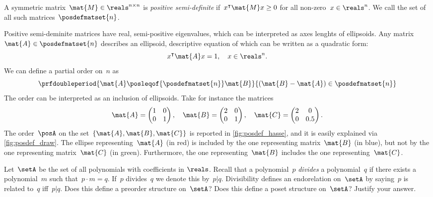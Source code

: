 \begin{example}
	\begin{definition}
		A symmetric matrix~$\mat{M}\in \reals^{n\times n}$ is \emph{positive semi-definite} if~$x^\intercal \mat{M}x\geq 0$ for all non-zero~$x\in \reals^n$.
		We call the set of all such matrices~$\posdefmatset{n}$.
	\end{definition}
	Positive semi-deminite matrices have real, semi-positive eigenvalues, which can be interpreted as axes lenghts of ellipsoids.
	Any matrix~$\mat{A}\in \posdefmatset{n}$ describes an ellipsoid, descriptive equation of which can be written as a quadratic form:
	\begin{equation*}
		x^\intercal \mat{A}x=1,\quad x\in \reals^n.
	\end{equation*}
	We can define a partial order on~$n$ as
	\begin{equation*}
		\prfdoubleperiod{
			\mat{A}\posleqof{\posdefmatset{n}} \mat{B}
		}{
			(\mat{B}-\mat{A})\in \posdefmatset{n}
		}
	\end{equation*}
	The order can be interpreted as an inclusion of ellipsoids.
	Take for instance the matrices
	\begin{equation*}
		\mat{A}=
		\begin{pmatrix}
			1 & 0 \\0& 1
		\end{pmatrix}, \quad \mat{B}=
		\begin{pmatrix}
			2 & 0 \\0& 1
		\end{pmatrix},\quad \mat{C}=
		\begin{pmatrix}
			2 & 0 \\0& 0.5
		\end{pmatrix}.
	\end{equation*}
	The order~$\posA$ on the set~$\{\mat{A},\mat{B},\mat{C}\}$ is reported in \cref{fig:posdef_hasse}, and it is easily explained via \cref{fig:posdef_draw}.
	The ellipse representing~$\mat{A}$ (in red) is included by the one representing matrix~$\mat{B}$ (in blue), but not by the one representing matrix~$\mat{C}$ (in green).
	Furthermore, the one representing~$\mat{B}$ includes the one representing~$\mat{C}$.
\end{example}

\vfill
%

\begin{gradedexercise}
	\label{ex:PolynomialDivisibility}
	Let~$\setA$ be the set of all polynomials with coefficients in $\reals$.
	Recall that a polynomial~$p$ \emph{divides} a polynomial~$q$ if there exists a polynomial~$m$ such that~$p \cdot m = q$.
	If~$p$ divides~$q$ we denote this by~$p \vert q$.
	Divisibility defines an endorelation on~$\setA$ by saying~$p$ is related to~$q$ iff~$p \vert q$.
	Does this define a preorder structure on~$\setA$?
	Does this define a poset structure on~$\setA$?
	Justify your answer.
\end{gradedexercise}

